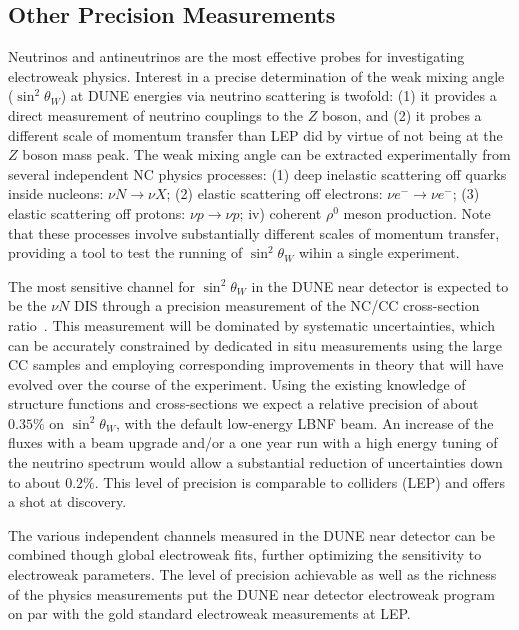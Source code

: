 \subsection{Other Precision Measurements}

Neutrinos and antineutrinos are the most effective probes for investigating electroweak physics.  
Interest in a precise determination of the weak mixing angle ($\sin^2 \theta_W$) at DUNE 
energies via neutrino scattering is twofold: (1) it provides a direct measurement of neutrino couplings to 
the $Z$ boson, and (2) it probes a different scale of momentum transfer than LEP did by virtue
of not being at the $Z$ boson mass peak. 
% 
The weak mixing angle can be extracted experimentally from several independent NC physics processes:
(1) deep inelastic scattering off quarks inside nucleons: $\nu N \to \nu X$; (2) elastic scattering off electrons: $\nu e^- \to \nu e^-$; 
(3) elastic scattering off protons: $\nu p \to \nu p$; iv) coherent $\rho^0$ meson production. 
Note that these processes involve
substantially different scales of momentum transfer, providing a tool
to test the running of $\sin^2 \theta_W$ wihin a single experiment. 

The most sensitive channel for $\sin^2 \theta_W$ 
in the DUNE near detector is expected to be the $\nu N$ DIS through a precision measurement 
of the NC/CC cross-section ratio~\cite{near-detector-EW}. This measurement will be dominated by systematic uncertainties, which can be 
accurately constrained by dedicated in situ measurements using the large CC samples and employing corresponding 
improvements in theory that will have evolved over the course of the experiment. Using the existing knowledge of 
structure functions and cross-sections we expect a relative precision of about $0.35\%$ on $\sin^2 \theta_W$, with 
the default low-energy LBNF beam. An increase of the fluxes with a beam upgrade and/or a one year run with a high 
energy tuning of the neutrino spectrum would allow a substantial reduction of uncertainties down to about $0.2\%$. 
This level of precision is comparable to colliders (LEP) and offers a shot at discovery.
 
The various independent channels measured in the DUNE near detector can be combined though global electroweak fits, 
further optimizing the sensitivity to electroweak parameters. The level of precision achievable as well as the richness of 
the physics measurements put the DUNE near detector electroweak program on par with the gold standard electroweak measurements at LEP.   



